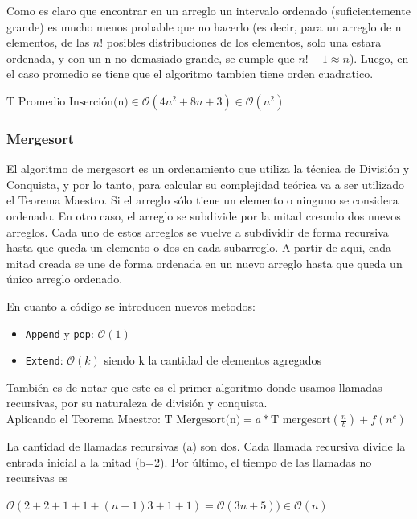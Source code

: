 \documentclass[article,a4paper]{article}
\begin{document}
Como es claro que encontrar en un arreglo un intervalo ordenado (suficientemente grande) es mucho menos probable que no hacerlo (es decir, para un arreglo de n elementos, de las $n!$ posibles distribuciones de los elementos, solo una estara ordenada, y con un n no demasiado grande, se cumple que $n!-1 \approx n$). Luego, en el caso promedio se tiene que el algoritmo tambien tiene orden cuadratico.

$\mbox{T Promedio Inserción(n)} \in \mathcal O(4n^2 + 8n + 3) \in \mathcal O(n^2)$

\subsubsection{Mergesort}

El algoritmo de mergesort es un ordenamiento que utiliza la técnica de División y Conquista, y por lo tanto, para calcular su complejidad teórica va a ser utilizado el Teorema Maestro. Si el arreglo sólo tiene un elemento o ninguno se considera ordenado. En otro caso, el arreglo se subdivide por la mitad creando dos nuevos arreglos. Cada uno de estos arreglos se vuelve a subdividir de forma recursiva hasta que queda un elemento o dos en cada subarreglo. A partir de aqui, cada mitad creada se une de forma ordenada en un nuevo arreglo hasta que queda un único arreglo ordenado.

En cuanto a código se introducen nuevos metodos:

\begin{itemize}
\item \texttt{Append} y \texttt{pop}: $\mathcal O(1)$
\item \texttt{Extend}: $\mathcal O(k)$ siendo k la cantidad de elementos agregados 
\end{itemize}

También es de notar que este es el primer algoritmo donde usamos llamadas recursivas, por su naturaleza de división y conquista.\\

Aplicando el Teorema Maestro: $\mbox{T Mergesort(n)} = a * \mbox{T mergesort}(\frac{n}{b}) + f(n^c)$

La cantidad de llamadas recursivas (a) son dos. Cada llamada recursiva divide la entrada inicial a la mitad (b=2). Por último, el tiempo de las llamadas no recursivas es 

$\mathcal O(2 + 2 + 1 + 1 + (n-1) 3 + 1 + 1) = \mathcal O(3n + 5)) \in \mathcal O(n)$\\
\end{document}
